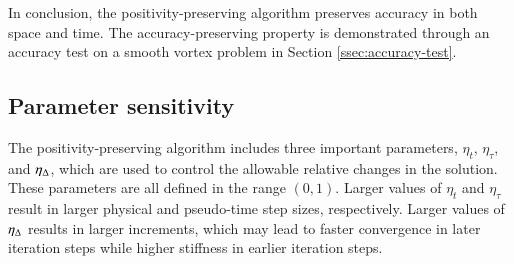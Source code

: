 In conclusion, the positivity-preserving algorithm preserves accuracy in both space and time. The accuracy-preserving property is demonstrated through an accuracy test on a smooth vortex problem in Section \ref{ssec:accuracy-test}.

\subsection{Parameter sensitivity}
\label{ssec:influence-parameters}

The positivity-preserving algorithm includes three important parameters, $\eta_t$, $\eta_{\tau}$, and $\eta_{\mathrm\Delta}$, which are used to control the allowable relative changes in the solution. These parameters are all defined in the range $(0,1)$. Larger values of $\eta_t$ and $\eta_{\tau}$ result in larger physical and pseudo-time step sizes, respectively. Larger values of $\eta_{\mathrm\Delta}$ results in larger increments, which may lead to faster convergence in later iteration steps while higher stiffness in earlier iteration steps. 

